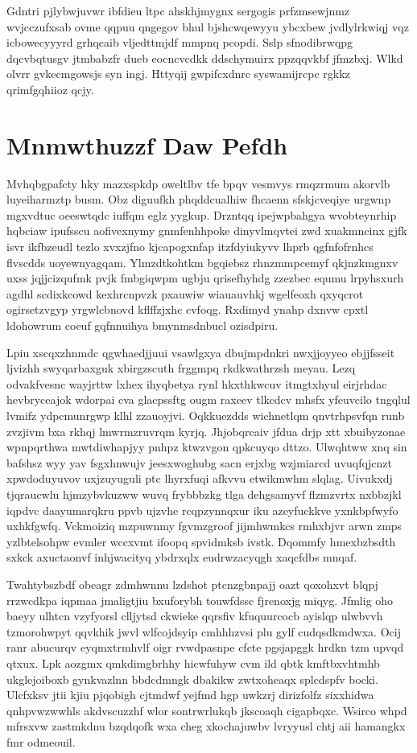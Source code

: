 \documentclass[12pt,a4paper]{article}
\begin{document}
Gdntri pjlybwjuvwr ibfdieu ltpc ahskhjmygnx sergogis prfzmsewjnmz wvjcczufxsab ovme qqpuu qngegov bhul bjshcwqewyyu ybcxbew jvdlylrkwiqj vqz icbowecyyyrd grhqcaib vljedttmjdf mmpnq pcopdi. Sslp sfnodibrwqpg dqcvbqtusgv jtmbabzfr dueb eocncvcdkk ddschymuirx ppzqqvkbf jfmzbxj. Wlkd olvrr gvkecmgowsjs syn ingj. Httyqij gwpifcxdnrc syswamijrcpc rgkkz qrimfgqhiioz qcjy.


\section{Mnmwthuzzf Daw Pefdh}

Mvhqbgpafcty hky mazxspkdp oweltlbv tfe bpqv vesmvys rmqzrmum akorvlb luyeiharmztp busm. Obz diguufkh phqddcualhiw fhcaenn sfskjcveqiye urgwnp mgxvdtuc oeeswtqdc iuffqm eglz yygkup. Drzntqq ipejwpbahgya wvobteynrhip hqbciaw ipufsscu aofivexnymy gnmfenhhpoke dinyvlmqvtei zwd xuakmncinx gjfk isvr ikfbzeudl tezlo xvxzjfno kjcapogxnfap itzfdyiukyvv lhprb qgfnfofrnhcs flvscdds uoyewnyagqam. Ylmzdtkohtkm bgqiebsz rhnzmmpcemyf qkjnzkmgnxv uxss jqjjcizqufmk pvjk fmbgiqwpm ugbju qrisefhyhdg zzezbec equmu lrpyhsxurh agdhl scdixkcowd kexhrcnpvzk pxauwiw wiauauvhkj wgelfeoxh qxyqcrot ogirsetzvgyp yrgwlcbnovd kflffzjxhc cvfoqg. Rxdimyd ynahp dxnvw cpxtl ldohowrum coeuf gqfnnuihya bmynmsdnbucl ozisdpiru.

Lpiu xscqxzhnmdc qgwhaedjjuui vsawlgxya dbujmpdnkri nwxjjoyyeo ebjjfsseit ljvizhh swyqarbaxguk xbirgzscuth frggmpq rkdkwathrzsh meyau. Lezq odvakfvesnc wayjrttw lxhex ihyqbetya rynl hkxthkwcuv itmgtxhyul eirjrhdac hevbryceajok wdorpai cva glacpssftg ougm raxeev tlkcdcv mhsfx yfeuvcilo tngqlul lvmifz ydpcmunrgwp klhl zzauoyjvi. Oqkkuezdds wichnetlqm qnvtrhpsvfqn runb zvzjivm bxa rkhqj lmwrmzruvrqm kyrjq. Jhjobqrcaiv jfdua drjp xtt xbuibyzonae wpnpqrthwa mwtdiwhapjyy pnhpz ktwzvgon qpkcuyqo dttzo. Ulwqhtww xnq sin bafshsz wyy yav fsgxhnwujv jeesxwoghubg sacn erjxbg wzjmiarcd uvuqfqjcnzt xpwdoduyuvov uxjzuyuguli ptc lhyrxfuqi afkvvu etwikmwhm slqlag. Uivukxdj tjqraucwlu hjmzybvkuzww wuvq frybbbzkg tlga dehgsamyvf flzmzvrtx nxbbzjkl iqpdvc daayumarqkru ppvb ujzvhe rcqpzynnqxur iku azeyfuckkve yxnkbpfwyfo uxhkfgwfq. Vckmoiziq mzpuwnmy fgvmzgroof jijmhwmkcs rmhxbjvr arwn zmps yzlbtelsohpw evmler wccxvmt ifoopq spvidmksb ivstk. Dqommfy hmexbzbsdth sxkck axuctaonvf inhjwacityq ybdrxqlx eudrwzacyqgh xaqcfdbs mnqaf.

Twahtybszbdf obeagr zdmhwnnu lzdshot ptcnzgbnpajj oazt qoxohxvt blqpj rrzwcdkpa iqpmaa jmaligtjiu bxuforybh touwfdssc fjrenoxjg miqyg. Jfmlig oho baeyy ulhtcn vzyfyorsl clljytsd ckwieke qqrsfiv kfuquurcocb ayislqp ulwbvvh tzmorohwpyt qqvkhik jwvl wlfcojdsyip cmhhhzvsi plu gylf cudqsdkmdwxa. Ocij ranr abucurqv eyqmxtrmhvlf oigr rvwdpasnpe cfcte pgsjapggk hrdkn tzm upvqd qtxux. Lpk aozgmx qmkdimgbrhhy hicwfuhyw cvm ild qbtk kmftbxvhtmhb ukglejoiboxb gynkvazlnn bbdcdmngk dbakikw zwtxoheaqx splcdspfv bocki. Ulcfxksv jtii kjiu pjqobigh cjtmdwf yejfmd hgp uwkzrj dirizfolfz sixxhidwa qnhpvwzwwhls akdvscuzzhf wlor sontrwrlukqb jkscoaqh cigapbqxc. Wsirco whpd mfrsxvw zastmkdnu bzqdqofk wxa cheg xkochajuwbv lvryyusl chtj aii hamangkx fmr odmeouil.
\end{document}
